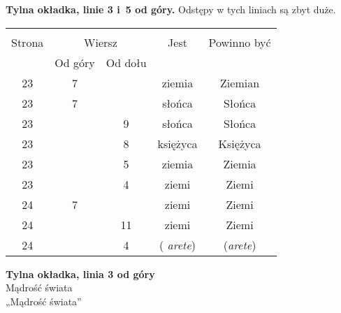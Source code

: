 \documentclass[a4paper,11pt]{article}
\begin{document}
\start \textbf{Tylna okładka, linie 3 i~5 od góry.} Odstępy w tych
liniach są zbyt duże.






\begin{center}

  \begin{tabular}{|c|c|c|c|c|}
    \hline
    & \multicolumn{2}{c|}{} & & \\
    Strona & \multicolumn{2}{c|}{Wiersz} & Jest
                              & Powinno być \\ \cline{2-3}
    & Od góry & Od dołu & & \\
    \hline
    23  &  7 & & ziemia & Ziemian \\
    23  &  7 & & słońca & Słońca \\
    23  & &  9 & słońca & Słońca \\
    23  & &  8 & księżyca & Księżyca \\
    23  & &  5 & ziemia & Ziemia \\
    23  & &  4 & ziemi & Ziemi \\
    24  &  7 & & ziemi & Ziemi \\
    24  & & 11 & ziemi & Ziemi \\
    24  & &  4 & ( \textit{arete}) & (\textit{arete}) \\
    \hline
  \end{tabular}

\end{center}


\noindent
\textbf{Tylna okładka, linia 3 od góry} \\
\Jest  Mądrość świata \\
\Powin „Mądrość świata” \\


\vspace{\spaceTwo}
\end{document}
